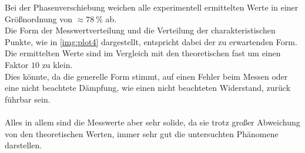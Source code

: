 \noindent
Bei der Phasenverschiebung weichen alle experimentell ermittelten Werte in einer Größnordnung von $\approx \SI{78}{\percent}$ ab.\\
Die Form der Messwertverteilung und die Verteilung der charakteristischen Punkte, wie in \ref{img:plot4} dargestellt, entspricht dabei der zu erwartenden Form.
Die ermittelten Werte sind im Vergleich mit den theoretischen fast um einen Faktor $10$ zu klein.\\
Dies könnte, da die generelle Form stimmt, auf einen Fehler beim Messen oder eine nicht beachtete Dämpfung, 
wie einen nicht beachteten Widerstand, zurück führbar sein.\\\\
\noindent
Alles in allem sind die Messwerte aber sehr solide, da sie trotz großer Abweichung von den theoretischen Werten, 
immer sehr gut die untersuchten Phänomene darstellen.
\newpage

